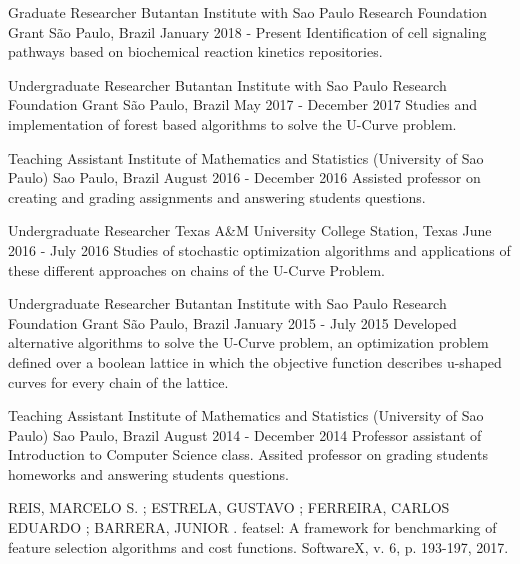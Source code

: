 \documentclass[11pt, a4paper]{awesome-cv-res}
\begin{document}
\begin{cventries}
\cventry
{Graduate Researcher}
{Butantan Institute with Sao Paulo Research Foundation Grant}
{São Paulo, Brazil}
{January 2018 - Present}
{Identification of cell signaling pathways based on biochemical reaction 
    kinetics repositories.}
\newline

\cventry
{Undergraduate Researcher}
{Butantan Institute with Sao Paulo Research Foundation Grant}
{São Paulo, Brazil}
{May 2017 - December 2017}
{Studies and implementation of forest based algorithms to solve the 
    U-Curve problem.}
\newline

\cventry
{Teaching Assistant}
{Institute of Mathematics and Statistics (University of Sao Paulo)}
{Sao Paulo, Brazil}
{August 2016 - December 2016}
{Assisted professor on creating and grading assignments and answering 
    students questions.}
\newline 

\cventry
{Undergraduate Researcher}
{Texas A\&M University}
{College Station, Texas}
{June 2016 - July 2016}
{Studies of stochastic optimization algorithms and applications of these
    different approaches on chains of the U-Curve Problem.}
\newline 

\cventry
{Undergraduate Researcher}
{Butantan Institute with Sao Paulo Research Foundation Grant}
{São Paulo, Brazil}
{January 2015 - July 2015}
{Developed alternative algorithms to solve the U-Curve problem, an 
    optimization problem defined over a boolean lattice in which the 
    objective function describes u-shaped curves for every chain of the 
    lattice.}
\newline

\cventry
{Teaching Assistant}
{Institute of Mathematics and Statistics (University of Sao Paulo)}
{Sao Paulo, Brazil}
{August 2014 - December 2014}
{Professor assistant of Introduction to Computer Science class. Assited
    professor on grading students homeworks and answering students 
    questions.}
\end{cventries}
\begin{cventries}
\cventry
    {REIS, MARCELO S. ; ESTRELA, GUSTAVO ; FERREIRA, CARLOS EDUARDO ; BARRERA, JUNIOR . }
    {featsel: A framework for benchmarking of feature selection algorithms and cost functions.}
    {SoftwareX, v. 6, p. 193-197, 2017.}
    {}
    {}
\end{cventries}
\end{document}
